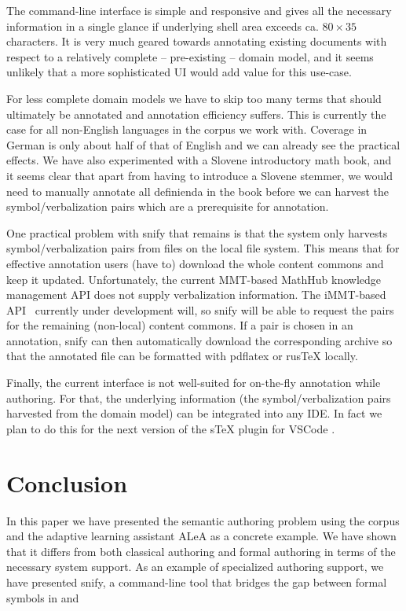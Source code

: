 \documentclass{llncs}
\newcommand\ALeA{\textsf{ALeA}\xspace}
\newcommand\snify{\textsf{snify}\xspace}
\begin{document}
The command-line interface is simple and responsive and gives all the necessary
information in a single glance if underlying shell area exceeds ca. $80\times 35$
characters. It is very much geared towards annotating existing documents with respect to a
relatively complete -- pre-existing -- domain model, and it seems unlikely that a more
sophisticated UI would add value for this use-case.

For less complete domain models we have to skip too many terms that should ultimately be
annotated and annotation efficiency suffers. This is currently the case for all
non-English languages in the \sTeX corpus we work with. Coverage in German is only about
half of that of English and we can already see the practical effects. We have also
experimented with a Slovene introductory math book, and it seems clear that apart from
having to introduce a Slovene stemmer, we would need to manually annotate all
definienda in the book before we can harvest the symbol/verbalization pairs which are a
prerequisite for annotation.

One practical problem with \snify that remains is that the system only harvests
symbol/verbalization pairs from \sTeX files on the local file system. This means that for
effective annotation users (have to) download the whole content commons and keep it
updated. Unfortunately, the current MMT-based MathHub knowledge management
API does not supply verbalization information. The iMMT-based
API~\cite{iMMT:on} currently under development will, so \snify will be able to request the
pairs for the remaining (non-local) content commons. If a pair is chosen in an annotation,
\snify can then automatically download the corresponding archive so that the annotated
file can be formatted with pdflatex or rusTeX locally.

Finally, the current interface is not well-suited for on-the-fly annotation while
authoring.  For that, the underlying information (the symbol/verbalization pairs harvested
from the domain model) can be integrated into any IDE. In fact we plan to do this for the
next version of the sTeX plugin for VSCode \cite{sTeX-IDE:git}.

\section{Conclusion}

In this paper we have presented the semantic authoring problem using the \sTeX corpus and
the adaptive learning assistant \ALeA as a concrete example. We have shown that it differs
from both classical authoring and formal authoring in terms of the necessary system
support. As an example of specialized authoring support, we have presented \snify, a
command-line tool that bridges the gap between formal symbols in \sTeX and 
\end{document}
